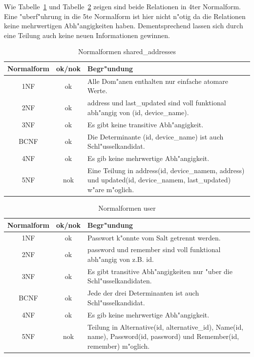 \vspace{2cm}



Wie Tabelle~\ref{tab: nf-addr} und Tabelle~\ref{tab: nf-user} zeigen sind beide Relationen in 4ter Normalform.
Eine {"u}berf{"u}hrung in die 5te Normalform ist hier nicht n{"o}tig da die Relationen keine mehrwertigen Abh{"a}ngigkeiten haben.
Dementsprechend lassen sich durch eine Teilung auch keine neuen Informationen gewinnen.


\begin{table}
    \centering
    \begin{tabular}{c|c|l}
        \textbf{Normalform} & \textbf{ok/nok} & \textbf{Begr{"u}ndung} \\
        \hline
        1NF & ok & \parbox{10cm}{Alle Dom{"a}nen enthalten nur einfache atomare Werte.} \\
        \hline
        2NF & ok & \parbox{10cm}{address und last\_updated sind voll funktional abh{"a}ngig von (id, device\_name).} \\
        \hline
        3NF & ok & \parbox{10cm}{Es gibt keine transitive Abh{"a}ngigkeit.} \\
        \hline
        BCNF & ok & \parbox{10cm}{Die Determinante (id, device\_name) ist auch Schl{"u}sselkandidat.} \\
        \hline
        4NF & ok & \parbox{10cm}{Es gib keine mehrwertige Abh{"a}ngigkeit.} \\
        \hline
        5NF & nok & \parbox{10cm}{Eine Teilung in address(id, device\_namem, address) und updated(id, device\_namem, last\_updated) w{"a}re m{"o}glich.} \\
    \end{tabular}
    \caption{Normalformen shared\_addresses}
    \label{tab: nf-addr}
\end{table}


\begin{table}
    \centering
    \begin{tabular}{c|c|l}
        \textbf{Normalform} & \textbf{ok/nok} & \textbf{Begr{"u}ndung} \\
        \hline
        1NF & ok & \parbox{10cm}{Passwort k{"o}nnte vom Salt getrennt werden.} \\
        \hline
        2NF & ok & \parbox{10cm}{password und remember sind voll funktional abh{"a}ngig von z.B. id.} \\
        \hline
        3NF & ok & \parbox{10cm}{Es gibt transitive Abh{"a}ngigkeiten nur {"u}ber die Schl{"u}sselkandidaten.} \\
        \hline
        BCNF & ok & \parbox{10cm}{Jede der drei Determinanten ist auch Schl{"u}sselkandidat.} \\
        \hline
        4NF & ok & \parbox{10cm}{Es gib keine mehrwertige Abh{"a}ngigkeit.} \\
        \hline
        5NF & nok & \parbox{10cm}{Teilung in Alternative(id, alternative\_id), Name(id, name), Password(id, password) und Remember(id, remember) m{"o}glich.} \\
    \end{tabular}
    \caption{Normalformen user}
    \label{tab: nf-user}
\end{table}
